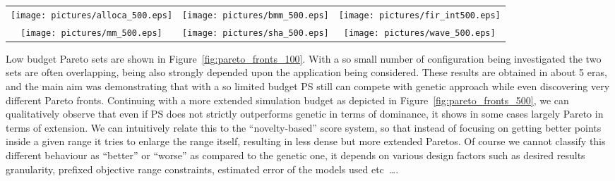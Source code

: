 \begin{table*}
  \centering
  \begin{tabular}{ccc}
    \texttt{[image: pictures/alloca\_500.eps]} &
    \texttt{[image: pictures/bmm\_500.eps]} & 
    \texttt{[image: pictures/fir\_int500.eps]} \\
    \texttt{[image: pictures/mm\_500.eps]} &
    \texttt{[image: pictures/sha\_500.eps]} &
    \texttt{[image: pictures/wave\_500.eps]} 
  \end{tabular}
  \caption{Pareto fronts found by PS and GA for a fixed budget of 500 configurations.}
  \label{fig:pareto_fronts_500}
\end{table*}

Low budget Pareto sets are shown in
Figure~\ref{fig:pareto_fronts_100}. With a so small number of
configuration being investigated the two sets are often overlapping,
being also strongly depended upon the application being considered.
These results are obtained in about 5 eras, and the main aim was
demonstrating that with a so limited budget PS still can compete with
genetic approach while even discovering very different Pareto fronts.
Continuing with a more extended simulation budget as depicted in
Figure~\ref{fig:pareto_fronts_500}, we can qualitatively observe that
even if PS does not strictly outperforms genetic in terms of dominance, it shows in
some cases largely Pareto in terms of extension. We can intuitively
relate this to the ``novelty-based'' score system, so that instead of
focusing on getting better points inside a given range it tries to
enlarge the range itself, resulting in less dense but more extended
Paretos. Of course we cannot classify this different behaviour as
``better'' or ``worse'' as compared to the genetic one, it depends on
various design factors such as desired results granularity, prefixed objective
range constraints, estimated error of the models used etc~\ldots.

